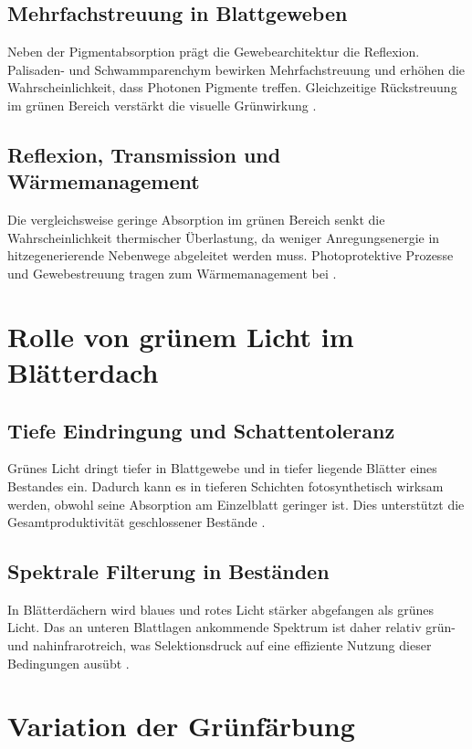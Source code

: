 \subsection{Mehrfachstreuung in Blattgeweben}
Neben der Pigmentabsorption prägt die Gewebearchitektur die Reflexion. Palisaden- und Schwammparenchym bewirken Mehrfachstreuung und erhöhen die Wahrscheinlichkeit, dass Photonen Pigmente treffen. Gleichzeitige Rückstreuung im grünen Bereich verstärkt die visuelle Grünwirkung \parencite{meyer2018photosynthese}.

\subsection{Reflexion, Transmission und Wärmemanagement}
Die vergleichsweise geringe Absorption im grünen Bereich senkt die Wahrscheinlichkeit thermischer Überlastung, da weniger Anregungsenergie in hitzegenerierende Nebenwege abgeleitet werden muss. Photoprotektive Prozesse und Gewebestreuung tragen zum Wärmemanagement bei \parencite{gao2010lightabsorption}.

\section{Rolle von grünem Licht im Blätterdach}

\subsection{Tiefe Eindringung und Schattentoleranz}
Grünes Licht dringt tiefer in Blattgewebe und in tiefer liegende Blätter eines Bestandes ein. Dadurch kann es in tieferen Schichten fotosynthetisch wirksam werden, obwohl seine Absorption am Einzelblatt geringer ist. Dies unterstützt die Gesamtproduktivität geschlossener Bestände \parencite{zhao2012chlorophyll}.

\subsection{Spektrale Filterung in Beständen}
In Blätterdächern wird blaues und rotes Licht stärker abgefangen als grünes Licht. Das an unteren Blattlagen ankommende Spektrum ist daher relativ grün- und nahinfrarotreich, was Selektionsdruck auf eine effiziente Nutzung dieser Bedingungen ausübt \parencite{renoult2017evolution}.

\section{Variation der Grünfärbung}

